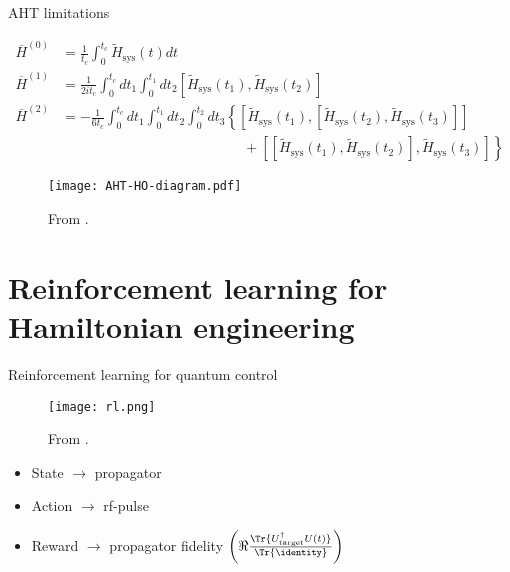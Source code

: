 \documentclass{beamer}
\begin{document}
\begin{frame}{AHT limitations}

{\scriptsize %
\begin{align*}
    \overline{H}^{(0)} &= \frac{1}{t_c} \int_0^{t_c}
        \widetilde{H}_{\text{sys}}(t) dt \\
    \overline{H}^{(1)} &= \frac{1}{2it_c} \int_0^{t_c} dt_1 \int_0^{t_1} dt_2
        \left[\widetilde{H}_{\text{sys}}(t_1), \widetilde{H}_{\text{sys}}(t_2)\right] \\
    \overline{H}^{(2)} &= -\frac{1}{6t_c}
    \int_0^{t_c} dt_1 \int_0^{t_1} dt_2 \int_0^{t_2} dt_3
    \left\{
    \left[\widetilde{H}_{\text{sys}}(t_1), \left[\widetilde{H}_{\text{sys}}(t_2), \widetilde{H}_{\text{sys}}(t_3)\right]\right] \right. \\
    & \hspace{13em} + \left.
    \left[\left[\widetilde{H}_{\text{sys}}(t_1), \widetilde{H}_{\text{sys}}(t_2)\right], \widetilde{H}_{\text{sys}}(t_3)\right]
    \right\}
\end{align*}
}
\begin{figure}
\centering
\texttt{[image: AHT-HO-diagram.pdf]}

{\scriptsize From \cite{brinkmann_2016}.}
\end{figure}



\end{frame}



\section{Reinforcement learning for Hamiltonian engineering}

\begin{frame}{Reinforcement learning for quantum control}

\begin{figure}
\centering
\texttt{[image: rl.png]}

From \cite{sutton2018reinforcement}.
\end{figure}

\begin{itemize}
    \item State $\to$ propagator
    \item Action $\to$ rf-pulse
    \item Reward $\to$ propagator fidelity $\left(\Re{
        \frac{\Tr{U_\text{target}^\dagger U(t)}}{\Tr{\identity}}
    }\right)$
\end{itemize}

\end{frame}
\end{document}
